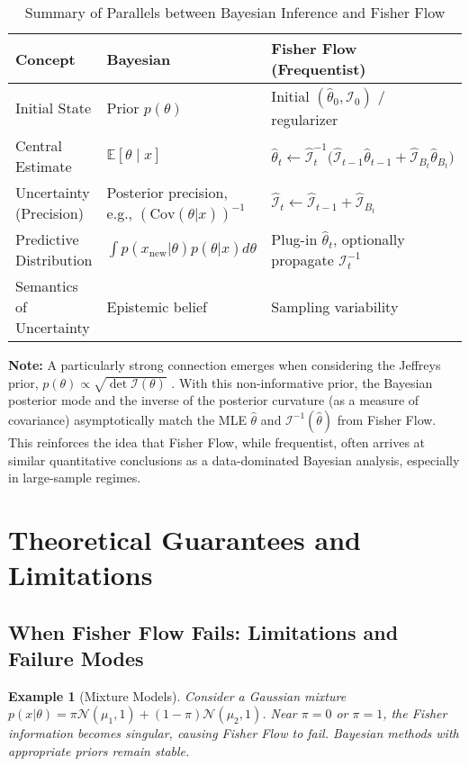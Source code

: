 \documentclass[11pt]{article}
\newtheorem{example}[theorem]{Example}
\begin{document}
\begin{table}[h!]
\centering
\begin{tabular}{l m{4.2cm} m{5.8cm}} 
\toprule
Concept & Bayesian & Fisher Flow (Frequentist) \\
\midrule
Initial State & Prior $p(\theta)$ & Initial $(\hat\theta_0, \mathcal{I}_0)$ / regularizer \\
Central Estimate & $\mathbb E[\theta\mid x]$ & $\hat\theta_{t} \leftarrow \hat{\mathcal I}_{t}^{-1}\bigl(\hat{\mathcal I}_{t-1}\hat\theta_{t-1} + \hat{\mathcal I}_{B_t}\hat\theta_{B_t}\bigr)$ \\
Uncertainty (Precision) & Posterior precision, e.g., $(\text{Cov}(\theta|x))^{-1}$ & $\hat{\mathcal I}_{t} \leftarrow \hat{\mathcal I}_{t-1} + \hat{\mathcal I}_{B_t}$ \\
Predictive Distribution & $\int p(x_{\text{new}}|\theta)p(\theta|x)d\theta$ & Plug-in $\hat\theta_t$, optionally propagate $\mathcal{I}_t^{-1}$ \\
Semantics of Uncertainty & Epistemic belief & Sampling variability \\
\bottomrule
\end{tabular}
\caption{Summary of Parallels between Bayesian Inference and Fisher Flow}
\label{tab:bayes_lpi_parallels}
\end{table}

\textbf{Note:} A particularly strong connection emerges when considering the Jeffreys prior, $p(\theta)\propto\sqrt{\det\mathcal I(\theta)}$ \cite{jeffreys1939theory, robert2007bayesian}. With this non-informative prior, the Bayesian posterior mode and the inverse of the posterior curvature (as a measure of covariance) asymptotically match the MLE $\hat{\theta}$ and $\mathcal{I}^{-1}(\hat{\theta})$ from Fisher Flow. This reinforces the idea that Fisher Flow, while frequentist, often arrives at similar quantitative conclusions as a data-dominated Bayesian analysis, especially in large-sample regimes.

\section{Theoretical Guarantees and Limitations}

\subsection{When Fisher Flow Fails: Limitations and Failure Modes}

\begin{example}[Mixture Models]
Consider a Gaussian mixture $p(x|\theta) = \pi \mathcal{N}(\mu_1, 1) + (1-\pi)\mathcal{N}(\mu_2, 1)$. Near $\pi = 0$ or $\pi = 1$, the Fisher information becomes singular, causing Fisher Flow to fail. Bayesian methods with appropriate priors remain stable.
\end{example}
\end{document}

